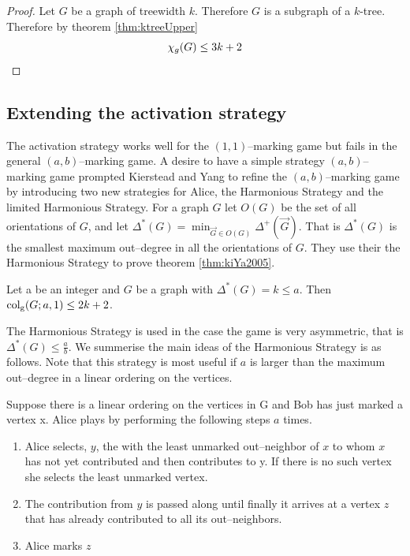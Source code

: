 \begin{proof}
    Let $G$ be a graph of treewidth $k$.
    Therefore $G$ is a subgraph of a $k$-tree. Therefore by theorem \ref{thm:ktreeUpper} \[\chi_g(G) \leq 3k + 2 \qedhere\] 
\end{proof}

\subsection{Extending the activation strategy}

The activation strategy works well for the $(1,1)$--marking game but fails in the general $(a,b)$--marking game. A desire to have a simple strategy $(a,b)$--marking game prompted Kierstead and Yang to refine the $(a,b)$--marking game by introducing two new strategies for Alice, the Harmonious Strategy and the limited Harmonious Strategy.  For a graph $G$ let $O(G)$ be the set of all orientations of $G$, and let $\Delta^*(G)=\min_{\vec{G}\in O(G)}\Delta^+(\vec{G})$. That is $\Delta^*(G)$ is the smallest maximum out--degree in all the orientations of $G$. They use their the Harmonious Strategy to prove theorem \ref{thm:kiYa2005}.

\begin{theorem}\label{thm:kiYa2005}
    Let a be an integer and $G$ be a graph with $\Delta^*(G) = k\leq a$. Then
    $\operatorname{col_g}(G;a,1) \leq 2k + 2$.
\end{theorem}

The Harmonious Strategy is used in the case the game is very asymmetric, that is $\Delta^*(G)\leq \frac{a}{b}$. We summerise the main ideas of the Harmonious Strategy is as follows. Note that this strategy is most useful if $a$ is larger than the maximum out--degree in a linear ordering on the vertices.

Suppose there is a linear ordering on the vertices in G and Bob has just marked a vertex x. Alice plays by performing the following steps $a$ times.    
\begin{enumerate}
    \item  Alice selects, $y$, the with the least unmarked out--neighbor of $x$ to whom $x$ has not yet contributed and then contributes to y. If there is no such vertex she selects the least unmarked vertex.
    \item  The contribution from $y$
    is passed along until finally it arrives at a vertex $z$ that has already contributed to all its out--neighbors.
    \item  Alice marks $z$
\end{enumerate}

